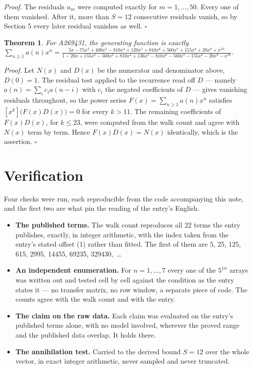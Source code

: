 \documentclass[11pt]{article}
\newtheorem{theorem}{Theorem}
\theoremstyle{definition}
\begin{document}
{\itshape Proof.} The residuals $u_m$ were computed exactly for $m = 1,\dots,50$. Every one of them vanished. After it, more than $S = 12$ consecutive residuals vanish, so by Section 5 every later residual vanishes as well. $\square$

\begin{theorem} For A269431, the generating function is exactly $\sum_{n\ge 1} a(n)x^n = \frac{5x - 75x^{2} + 400x^{3} - 810x^{4} + 120x^{5} + 810x^{6} + 560x^{7} + 155x^{8} + 20x^{9} + x^{10}}{1 - 20x + 155x^{2} - 560x^{3} + 810x^{4} + 136x^{5} - 810x^{6} - 560x^{7} - 155x^{8} - 20x^{9} - x^{10}}$.\end{theorem}

{\itshape Proof.} Let $N(x)$ and $D(x)$ be the numerator and denominator above, $D(0)=1$. The residual test applied to the recurrence read off $D$ --- namely $a(n) = \sum_i c_i a(n-i)$ with $c_i$ the negated coefficients of $D$ --- gives vanishing residuals throughout, so the power series $F(x)=\sum_{n\ge 1}a(n)x^n$ satisfies $[x^k]\bigl(F(x)D(x)\bigr) = 0$ for every $k > 11$. The remaining coefficients of $F(x)D(x)$, for $k \le 23$, were computed from the walk count and agree with $N(x)$ term by term. Hence $F(x)D(x) = N(x)$ identically, which is the assertion. $\square$

\section{Verification}

Four checks were run, each reproducible from the code accompanying this note, and the first two are what pin the reading of the entry's English.

\begin{itemize}

\item {\bfseries The published terms.} The walk count reproduces all 22 terms the entry publishes, exactly, in integer arithmetic, with the index taken from the entry's stated offset (1) rather than fitted. The first of them are 5, 25, 125, 615, 2995, 14455, 69235, 329430,~\dots

\item {\bfseries An independent enumeration.} For $n = 1,\dots,7$ every one of the $5^{1n}$ arrays was written out and tested cell by cell against the condition as the entry states it --- no transfer matrix, no row window, a separate piece of code. The counts agree with the walk count and with the entry.

\item {\bfseries The claim on the raw data.} Each claim was evaluated on the entry's published terms alone, with no model involved, wherever the proved range and the published data overlap. It holds there.

\item {\bfseries The annihilation test.} Carried to the derived bound $S = 12$ over the whole vector, in exact integer arithmetic, never sampled and never truncated.

\end{itemize}
\end{document}
